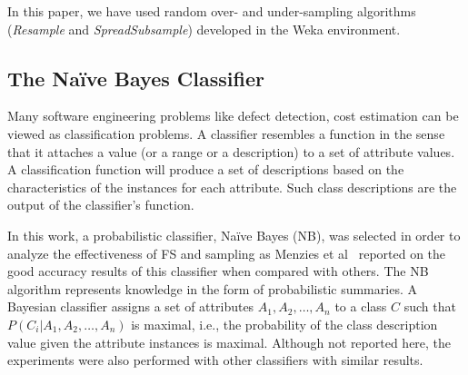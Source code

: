 \documentclass{elsart}
\begin{document}

In this paper, we have used random over- and under-sampling algorithms (\emph{Resample} and \emph{SpreadSubsample}) developed in
the Weka environment.


\subsection{The Na\"ive Bayes Classifier}

Many software engineering problems like defect detection, cost estimation can be viewed as classification problems. A classifier
resembles a function in the sense that it attaches a value (or a range or a description) to a set of attribute values. A classification function will produce a set of descriptions based on the characteristics of the instances for each attribute. Such class descriptions are the output of the classifier's function.

In this work, a probabilistic classifier, Na\"ive Bayes (NB), was selected in order to analyze the effectiveness of FS and sampling as Menzies et al~\cite{MenziesEtAl07} reported on the good accuracy results of this classifier when compared with others. The NB~\cite{Mit97} algorithm represents knowledge in the form of probabilistic summaries. A Bayesian classifier assigns a set of
attributes $A_1, A_2,\dots,A_n$ to a class $C$ such that $P(C_{i} | A_1, A_2,\dots,A_n)$ is maximal, i.e., the probability of the class description value given the attribute instances is maximal. Although not reported here, the experiments were also performed with other classifiers with similar results.

%
\end{document}
